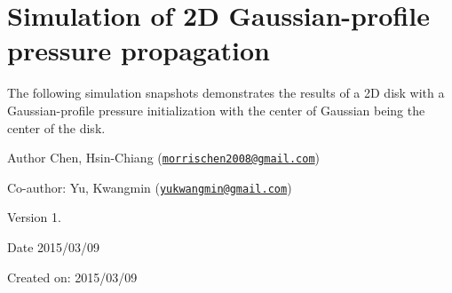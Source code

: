 \hypertarget{index_sec6}{}\section{Simulation of 2\-D Gaussian-\/profile pressure propagation}\label{index_sec6}
The following simulation snapshots demonstrates the results of a 2\-D disk with a Gaussian-\/profile pressure initialization with the center of Gaussian being the center of the disk.

  



\begin{DoxyAuthor}{Author}
Chen, Hsin-\/\-Chiang (\href{mailto:morrischen2008@gmail.com}{\tt morrischen2008@gmail.\-com})
\end{DoxyAuthor}
Co-\/author\-: Yu, Kwangmin (\href{mailto:yukwangmin@gmail.com}{\tt yukwangmin@gmail.\-com})

\begin{DoxyVersion}{Version}
1.
\end{DoxyVersion}
\begin{DoxyDate}{Date}
2015/03/09
\end{DoxyDate}
Created on\-: 2015/03/09 